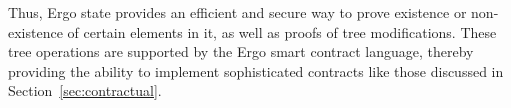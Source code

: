 Thus, Ergo state provides an efficient and secure way to prove existence or non-existence of certain elements in
it, as well as proofs of tree modifications.
These tree operations are supported by the Ergo smart contract language, thereby providing the ability to implement sophisticated contracts like those discussed in Section~\ref{sec:contractual}.

